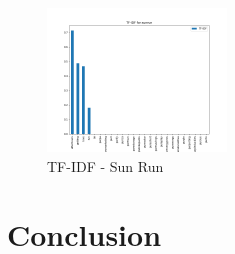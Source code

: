 \documentclass[sigconf, nonacm]{acmart}
\begin{document}
\begin{figure}[H]
  \centering
  \includegraphics[width=\linewidth, height =1.5in]{sunruntfidf.png}
  \caption{TF-IDF - Sun Run}
\end{figure}




\section{Conclusion}
\end{document}
